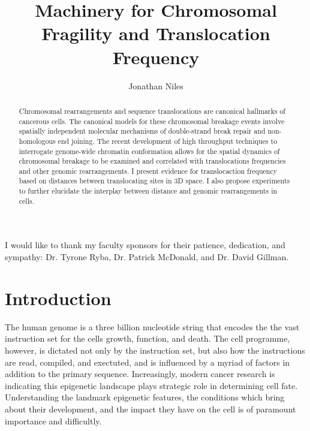 \documentclass[phd,tocprelim]{cornell}
\title{Machinery for Chromosomal Fragility and Translocation Frequency}
\author{Jonathan Niles}
\begin{document}
\maketitle
\makecopyright%

\begin{abstract}
Chromosomal rearrangements and sequence translocations are
canonical hallmarks of cancerous cells.  The canonical models
for these chromosomal breakage events involve spatially
independent molecular mechanisms of double-strand break
repair and non-homologous end joining.  The recent development of high
throughput techniques to interrogate genome-wide chromatin
conformation allows for the spatial dynamics of chromosomal
breakage to be examined and correlated with translocations
frequencies and other genomic rearrangements.  I present
evidence for translocaction frequency based on distances between
translocating sites in 3D space.  I also propose experiments
to further elucidate the interplay between distance and
genomic rearrangements in cells.
\end{abstract}


\begin{acknowledgements}
I would like to thank my faculty sponsors for their patience,
dedication, and sympathy: Dr. Tyrone Ryba, Dr. Patrick McDonald,
and Dr. David Gillman.
\end{acknowledgements}

\contentspage%
\tablelistpage%
\figurelistpage%

\normalspacing\setcounter{page}{1} 
\pagestyle{cornell} \addtolength{\parskip}{0.5\baselineskip}

\chapter{Introduction}

The human genome is a three billion nucleotide string that encodes the
the vast instruction set for the cells growth, function, and death.  The cell
programme, however, is dictated not only by the instruction set, but also
how the instructions are read, compiled, and exectuted, and is influenced
by a myriad of factors in addition to the primary sequence.  Increasingly,
modern cancer research is indicating this epigenetic landscape plays strategic
role in determining cell fate.  Understanding the landmark epigenetic features,
the conditions which bring about their development, and the impact they have on
the cell is of paramount importance and difficultly.
\end{document}
